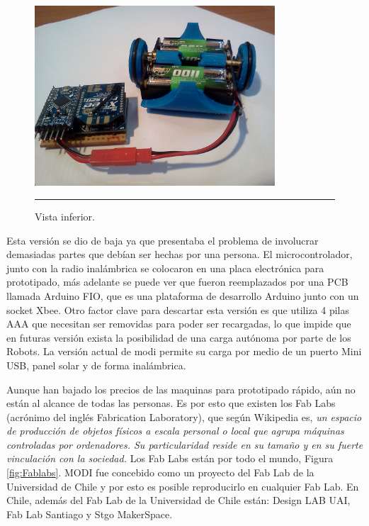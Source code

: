 \begin{figure}[htbp]
	\centering
		\includegraphics[width=0.8\textwidth]{./Pictures/3MODIrev2.jpg}
		\rule{35em}{0.5pt}
	\caption[vista inferior]{Vista inferior.}
	\label{vista inferior}
\end{figure}

Esta versión se dio de baja ya que presentaba el problema de involucrar demasiadas partes que debían ser hechas por una persona. El microcontrolador, junto con la radio inalámbrica se colocaron en una placa electrónica para prototipado, más adelante se puede ver que fueron reemplazados por una PCB llamada Arduino FIO, que es una plataforma de desarrollo Arduino junto con un socket Xbee. Otro factor clave para descartar esta versión es que utiliza 4 pilas AAA que necesitan ser removidas para poder ser recargadas, lo que impide que en futuras versión exista la posibilidad de una carga autónoma por parte de los Robots. La versión actual de modi permite su carga por medio de un puerto Mini USB, panel solar y de forma inalámbrica.

Aunque han bajado los precios de las maquinas para prototipado rápido, aún no están al alcance de todas las personas. Es por esto que existen los Fab Labs (acrónimo del inglés Fabrication Laboratory), que según Wikipedia es, \textit{un espacio de producción de objetos físicos a escala personal o local que agrupa máquinas controladas por ordenadores. Su particularidad reside en su tamaño y en su fuerte vinculación con la sociedad.} Los Fab Labs están por todo el mundo, Figura \ref{fig:Fablabs}. MODI fue concebido como un proyecto del Fab Lab de la Universidad de Chile y por esto es posible reproducirlo en cualquier Fab Lab. En Chile, además del Fab Lab de la Universidad de Chile están: Design LAB UAI, Fab Lab Santiago y Stgo MakerSpace. 

